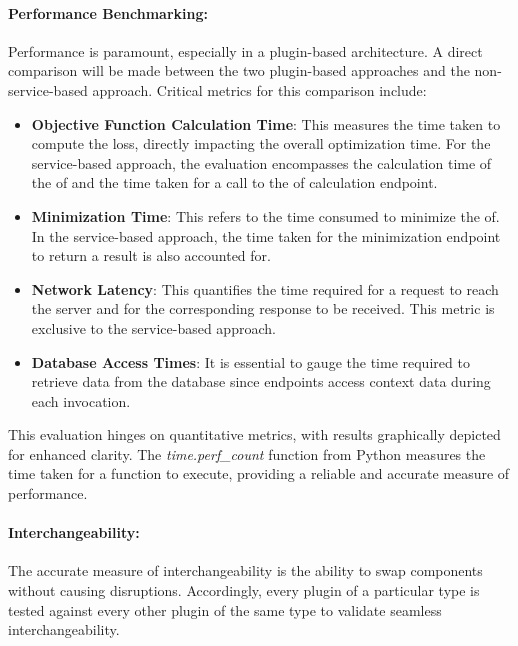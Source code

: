 \documentclass[
  a4paper,  %
  twoside,  %
  bibliography=totoc,
  headsepline,
  cleardoublepage=empty,
  parskip=half,
  draft=false
]{scrbook}
\begin{document}
\paragraph{Performance Benchmarking:}
\label{subsec:performanceBenchmarking}
Performance is paramount, especially in a plugin-based architecture.
A direct comparison will be made between the two plugin-based approaches and the non-service-based approach.
Critical metrics for this comparison include:

\begin{itemize}
\item \textbf{Objective Function Calculation Time}: This measures the time taken to compute the loss, directly impacting the overall optimization time.
For the service-based approach, the evaluation encompasses the calculation time of the \gls{of} and the time taken for a call to the \gls{of} calculation endpoint.

\item \textbf{Minimization Time}: This refers to the time consumed to minimize the \gls{of}.
In the service-based approach, the time taken for the minimization endpoint to return a result is also accounted for.

\item \textbf{Network Latency}: This quantifies the time required for a request to reach the server and for the corresponding response to be received.
This metric is exclusive to the service-based approach.

\item \textbf{Database Access Times}: It is essential to gauge the time required to retrieve data from the database since endpoints access context data during each invocation.
\end{itemize}

This evaluation hinges on quantitative metrics, with results graphically depicted for enhanced clarity.
The \emph{time.perf\_count} function from Python measures the time taken for a function to execute, providing a reliable and accurate measure of performance.

\paragraph{Interchangeability:}
The accurate measure of interchangeability is the ability to swap components without causing disruptions.
Accordingly, every plugin of a particular type is tested against every other plugin of the same type to validate seamless interchangeability.
\end{document}

